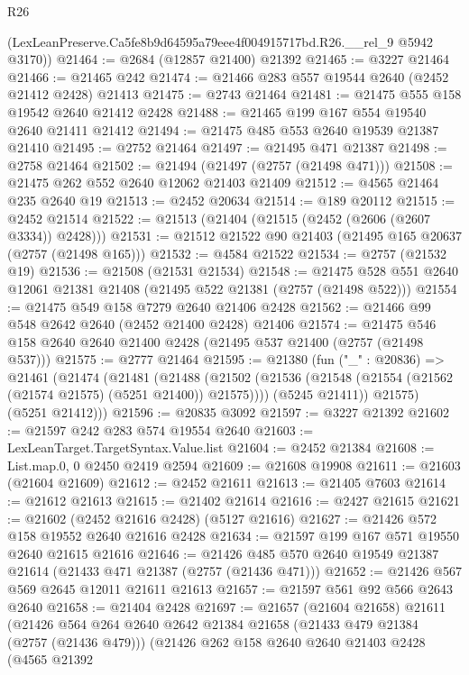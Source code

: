 \begin{lexlean}{R26}
\begin{coremodule}
      (LexLeanPreserve.Ca5fe8b9d64595a79eee4f004915717bd.R26.__rel_9 @5942 @3170))
@21464 := @2684 (@12857 @21400) @21392
@21465 := @3227 @21464
@21466 := @21465 @242
@21474 := @21466 @283 @557 @19544 @2640 (@2452 @21412 @2428) @21413
@21475 := @2743 @21464
@21481 := @21475 @555 @158 @19542 @2640 @21412 @2428
@21488 := @21465 @199 @167 @554 @19540 @2640 @21411 @21412
@21494 := @21475 @485 @553 @2640 @19539 @21387 @21410
@21495 := @2752 @21464
@21497 := @21495 @471 @21387
@21498 := @2758 @21464
@21502 := @21494 (@21497 (@2757 (@21498 @471)))
@21508 := @21475 @262 @552 @2640 @12062 @21403 @21409
@21512 := @4565 @21464 @235 @2640 @19
@21513 := @2452 @20634
@21514 := @189 @20112
@21515 := @2452 @21514
@21522 := @21513 (@21404 (@21515 (@2452 (@2606 (@2607 @3334)) @2428)))
@21531 := @21512 @21522 @90 @21403 (@21495 @165 @20637 (@2757 (@21498 @165)))
@21532 := @4584 @21522
@21534 := @2757 (@21532 @19)
@21536 := @21508 (@21531 @21534)
@21548 := @21475 @528 @551 @2640 @12061 @21381 @21408 (@21495 @522 @21381 (@2757 (@21498 @522)))
@21554 := @21475 @549 @158 @7279 @2640 @21406 @2428
@21562 := @21466 @99 @548 @2642 @2640 (@2452 @21400 @2428) @21406
@21574 := @21475 @546 @158 @2640 @2640 @21400 @2428 (@21495 @537 @21400 (@2757 (@21498 @537)))
@21575 := @2777 @21464
@21595 := @21380
    (fun ("_" : @20836) =>
    @21461
      (@21474
        (@21481
          (@21488
            (@21502 (@21536 (@21548 (@21554 (@21562 (@21574 @21575) (@5251 @21400)) @21575))))
            (@5245 @21411))
          @21575)
        (@5251 @21412)))
@21596 := @20835 @3092
@21597 := @3227 @21392
@21602 := @21597 @242 @283 @574 @19554 @2640
@21603 := LexLeanTarget.TargetSyntax.Value.list
@21604 := @2452 @21384
@21608 := List.map.{0, 0} @2450 @2419 @2594
@21609 := @21608 @19908
@21611 := @21603 (@21604 @21609)
@21612 := @2452 @21611
@21613 := @21405 @7603
@21614 := @21612 @21613
@21615 := @21402 @21614
@21616 := @2427 @21615
@21621 := @21602 (@2452 @21616 @2428) (@5127 @21616)
@21627 := @21426 @572 @158 @19552 @2640 @21616 @2428
@21634 := @21597 @199 @167 @571 @19550 @2640 @21615 @21616
@21646 := @21426 @485 @570 @2640 @19549 @21387 @21614 (@21433 @471 @21387 (@2757 (@21436 @471)))
@21652 := @21426 @567 @569 @2645 @12011 @21611 @21613
@21657 := @21597 @561 @92 @566 @2643 @2640
@21658 := @21404 @2428
@21697 := @21657
    (@21604 @21658)
    @21611
    (@21426
      @564
      @264
      @2640
      @2642
      @21384
      @21658
      (@21433 @479 @21384 (@2757 (@21436 @479)))
      (@21426
        @262
        @158
        @2640
        @2640
        @21403
        @2428
        (@4565
          @21392

\end{coremodule}
\end{lexlean}
